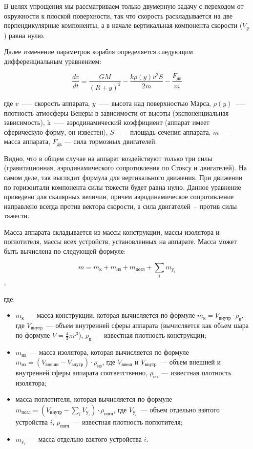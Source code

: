 \documentclass[12pt,a4paper]{article}
\begin{document}
В целях упрощения мы рассматриваем только двумерную задачу с переходом от окружности к
плоской поверхности, так что скорость раскладывается на две перпендикулярные компоненты, а
в начале вертикальная компонента скорости ($V_y$) равна нулю.

Далее изменение параметров корабля определяется следующим дифференциальным уравнением:

$$
\frac{dv}{dt} = \frac{G M}{(R + y)^2} - \frac{k \rho(y) v^2 S}{2 m} - \frac{F_{\text{дв}}}{m}
$$

где $v$~--— скорость аппарата, $y$~--— высота над поверхностью Марса, $\rho(y)$~--—
плотность атмосферы Венеры в зависимости от высоты (экспоненциальная зависимость), k~--—
аэродинамический коэффициент (аппарат имеет сферическую форму, он известен), $S$~--— площадь
сечения аппарата, $m$~--— масса аппарата, $F_{\text{дв}}$ — сила тормозных двигателей.

Видно, что в общем случае на аппарат воздействуют только три силы (гравитационная,
аэродинамического сопротивления по Стоксу и двигателей). На самом деле, так выглядит
формула для вертикального движения. При движении по горизонтали компонента силы тяжести
будет равна нулю. Данное уравнение приведено для скалярных величин, причем
аэродинамическое сопротивление направлено всегда против вектора скорости, а сила
двигателей~-- против силы тяжести.

Масса аппарата складывается из массы конструкции, массы изолятора и поглотителя, массы
всех устройств, установленных на аппарате. Масса может быть вычислена по следующей
формуле:

$$
m = m_{\text{к}} + m_{\text{из}} + m_{\text{погл}} + \sum\limits_{i}m_{\text{у}_i}
$$,

где:

\begin{itemize}
  \item $m_{\text{к}}$~--- масса конструкции, которая вычисляется по формуле $m_{\text{к}}
    = V_{\text{внутр}} \cdot \rho_{\text{к}}$, где $V_{\text{внутр}}$~--- объем внутренней
    сферы аппарата (вычисляется как объем шара по формуле $V = \frac{4}{3} \pi
    r^3$), $\rho_{\text{к}}$~--- известная плотность конструкции;
  \item $m_{\text{из}}$~--- масса изолятора, которая вычисляется по формуле $m_{\text{из}}
    = (V_{\text{внешн}} - V_{\text{внутр}}) \cdot \rho_{\text{из}}$, где
    $V_{\text{внеш}}$ и $V_{\text{внутр}}$~--- объем внешней и внутренней сферы аппарата
      соответственно, $\rho_{\text{из}}$~--- известная плотность изолятора;
  \item масса поглотителя, которая вычисляется по формуле $m_{\text{погл}} =
      \left(V_{\text{внутр}} - \sum\limits_{i}V_{\text{у}_i}\right)\cdot
      \rho_{\text{погл}}$, где $V_{\text{у}_i}$~--- объем отдельно взятого устройства $i$,
      $\rho_{\text{погл}}$~--- известная плотность поглотителя;
  \item $m_{\text{у}_i}$~--- масса отдельно взятого устройства $i$.
\end{itemize}
\end{document}
